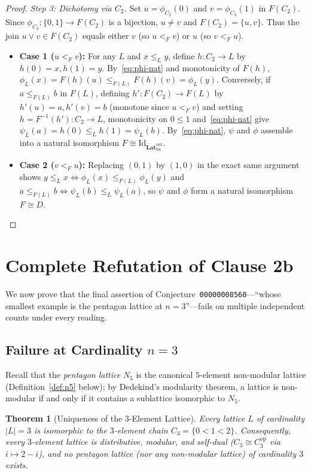 \documentclass[11pt]{article}
\newtheorem{theorem}{Theorem}[section]
\theoremstyle{definition}
\newcommand{\FinLatOrd}{\mathbf{Lat}_{\mathrm{fin}}^{\mathrm{ord}}}
\newcommand{\Id}{\mathrm{Id}}
\newcommand{\op}{\mathrm{op}}
\begin{document}
\begin{proof}
\emph{Step 3: Dichotomy via $C_2$.} Set $u = \phi_{C_2}(0)$ and
$v = \phi_{C_2}(1)$ in $F(C_2)$. Since $\phi_{C_2} : \{0, 1\} \to F(C_2)$ is a
bijection, $u \ne v$ and $F(C_2) = \{u, v\}$. Thus the join $u \vee v \in F(C_2)$
equals either $v$ (so $u <_F v$) or $u$ (so $v <_F u$).
\begin{itemize}
  \item \textbf{Case 1 ($u <_F v$):} For any $L$ and $x \le_L y$, define
  $h : C_2 \to L$ by $h(0) = x, h(1) = y$. By~\eqref{eq:phi-nat} and
  monotonicity of $F(h)$, $\phi_L(x) = F(h)(u) \le_{F(L)} F(h)(v) = \phi_L(y)$.
  Conversely, if $a \le_{F(L)} b$ in $F(L)$, defining $h' : F(C_2) \to F(L)$ by
  $h'(u) = a, h'(v) = b$ (monotone since $u <_F v$) and setting
  $h = F^{-1}(h') : C_2 \to L$, monotonicity on $0 \le 1$ and~\eqref{eq:phi-nat}
  give $\psi_L(a) = h(0) \le_L h(1) = \psi_L(b)$. By~\eqref{eq:phi-nat}, $\psi$
  and $\phi$ assemble into a natural isomorphism $F \cong \Id_{\FinLatOrd}$.
  \item \textbf{Case 2 ($v <_F u$):} Replacing $(0, 1)$ by $(1, 0)$ in the exact
  same argument shows $y \le_L x \iff \phi_L(x) \le_{F(L)} \phi_L(y)$ and
  $a \le_{F(L)} b \iff \psi_L(b) \le_L \psi_L(a)$, so $\psi$ and $\phi$ form a
  natural isomorphism $F \cong D$. \qedhere
\end{itemize}
\end{proof}

\section{Complete Refutation of Clause 2b}

We now prove that the final assertion of Conjecture~\texttt{00000008560}---``whose
smallest example is the pentagon lattice at $n = 3$''---fails on multiple
independent counts under every reading.

\subsection{Failure at Cardinality \texorpdfstring{$n = 3$}{n = 3}}

Recall that the \emph{pentagon lattice} $N_5$ is the canonical $5$-element
non-modular lattice (Definition~\ref{def:n5} below); by Dedekind's modularity
theorem, a lattice is non-modular if and only if it contains a sublattice
isomorphic to $N_5$.

\begin{theorem}[Uniqueness of the $3$-Element Lattice]
\label{thm:size3}
Every lattice $L$ of cardinality $|L| = 3$ is isomorphic to the $3$-element
chain $C_3 = \{0 < 1 < 2\}$. Consequently, every $3$-element lattice is
distributive, modular, and self-dual ($C_3 \cong C_3^{\op}$ via $i \mapsto 2 - i$),
and no pentagon lattice (nor any non-modular lattice) of cardinality $3$ exists.
\end{theorem}
\end{document}
